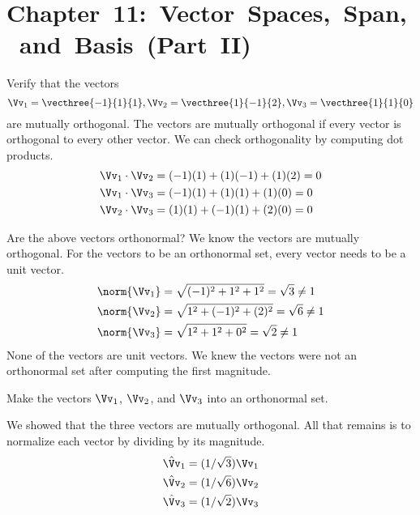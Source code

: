 \documentclass[12pt,ragged]{pajarticle}
\begin{document}

\section*{\hbox{Chapter 11: Vector Spaces, Span, and Basis (Part~II)}}

\begin{question}{1}{%
Verify that the vectors
\[ \Vv_1 = \vecthree{-1}{1}{1}, \Vv_2 = \vecthree{1}{-1}{2}, \Vv_3 = \vecthree{1}{1}{0} \]
are mutually orthogonal.}{%
The vectors are mutually orthogonal if every vector is orthogonal to every other vector. We can check orthogonality by computing dot products.
\begin{align*}
	\Vv_1\cdot\Vv_2 &= (-1)(1) + (1)(-1) + (1)(2) = 0 \\
	\Vv_1\cdot\Vv_3 &= (-1)(1) + (1)(1) + (1)(0) = 0 \\
	\Vv_2\cdot\Vv_3 &= (1)(1) + (-1)(1) + (2)(0) = 0	
\end{align*}
}
\end{question}

\begin{question}{2}{%
Are the above vectors orthonormal?}{%
We know the vectors are mutually orthogonal. For the vectors to be an orthonormal set, every vector needs to be a unit vector.
\begin{align*}
	\norm{\Vv_1} &= \sqrt{(-1)^2 + 1^2 + 1^2} = \sqrt{3} \ne 1 \\
	\norm{\Vv_2} &= \sqrt{1^2 + (-1)^2 + (2)^2} = \sqrt{6} \ne 1 \\
	\norm{\Vv_3} &= \sqrt{1^2 + 1^2 + 0^2} = \sqrt{2} \ne 1
\end{align*}
None of the vectors are unit vectors. We knew the vectors were not an orthonormal set after computing the first magnitude.
}
\end{question}

\begin{question}{3}{%
Make the vectors $\Vv_1$, $\Vv_2$, and $\Vv_3$ into	an orthonormal set.}{%
We showed that the three vectors are mutually orthogonal. All that remains is to normalize each vector by dividing by its magnitude.
\begin{align*}
	\hat{\Vv}_1 &= (1/\sqrt{3})\Vv_1 \\
	\hat{\Vv}_2 &= (1/\sqrt{6})\Vv_2 \\
	\hat{\Vv}_3 &= (1/\sqrt{2})\Vv_3	
\end{align*}

}
\end{question}
\end{document}
